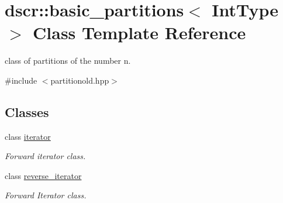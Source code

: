 \hypertarget{classdscr_1_1basic__partitions}{\section{dscr\-:\-:basic\-\_\-partitions$<$ Int\-Type $>$ Class Template Reference}
\label{classdscr_1_1basic__partitions}
}


class of partitions of the number n.  




{\ttfamily \#include $<$partitionold.\-hpp$>$}

\subsection*{Classes}
\begin{DoxyCompactItemize}
\item 
class \hyperlink{classdscr_1_1basic__partitions_1_1iterator}{iterator}
\begin{DoxyCompactList}\small\item\em Forward iterator class. \end{DoxyCompactList}\item 
class \hyperlink{classdscr_1_1basic__partitions_1_1reverse__iterator}{reverse\-\_\-iterator}
\begin{DoxyCompactList}\small\item\em Forward Iterator class. \end{DoxyCompactList}\end{DoxyCompactItemize}
